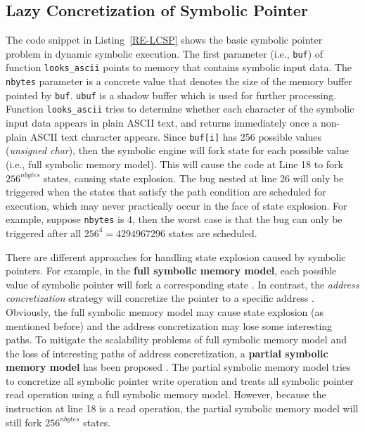\subsection{Lazy Concretization of Symbolic Pointer}
The code snippet in Listing~\ref{RE-LCSP} shows the basic symbolic pointer problem in dynamic symbolic execution. 
The first parameter (i.e., \texttt{buf}) of function \texttt{looks\_ascii} points to memory that contains symbolic input data. The \texttt{nbytes} parameter is a concrete value that denotes the size of the memory buffer pointed by \texttt{buf}. \texttt{ubuf} is a shadow buffer which is used for further processing. 
Function \texttt{looks\_ascii} tries to determine whether each character of the symbolic input data appears in plain ASCII text, and returns immediately once a non-plain ASCII text character appears. 
Since \texttt{buf[i]} has 256 possible values (\textit{unsigned char}), then the symbolic engine will fork state for each possible value (i.e., full symbolic memory model).
This will cause the code at Line 18 to fork $256^{nbytes}$ states, causing state explosion.
The bug nested at line 26 will only be triggered when the states that satisfy the path condition are scheduled for execution, which may never practically occur in the face of state explosion. For example, suppose \texttt{nbytes} is 4, then the worst case is that the bug can only be triggered after all $256^4=4294967296$ states are scheduled.

There are different approaches for handling state explosion caused by symbolic pointers. For example, in the \textbf{full symbolic memory model}, each possible value of symbolic pointer will fork a corresponding state \cite{song2008bitblaze, thakur2010directed, brumley2011bap, trtik2014symbolic}.
 In contrast, the \textit{address concretization} strategy will concretize the pointer to a specific address \cite{godefroid2005dart, burnim2008heuristics}.
 Obviously, the full symbolic memory model may cause state explosion (as mentioned before) and the address concretization may lose some interesting paths.
  To mitigate the scalability problems of full symbolic memory model and the loss of interesting paths of address concretization, a \textbf{partial symbolic memory model} has been proposed \cite{cha2012unleashing, avgerinos2014exploiting, Shoshitaishvili_firmalice-automatic}.
  The partial symbolic memory model tries to concretize all symbolic pointer write operation and treats all symbolic pointer read operation using a full symbolic memory model. 
  However, because the instruction at line 18 is a read operation, the partial symbolic memory model will still fork $256^{nbytes}$ states.


